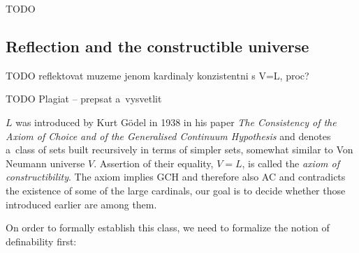 \documentclass[12pt,a4paper]{article}
\newtheorem{definition}[theorem]{Definition}
\newcommand{\bce}{\begin{compactenum}}
\newcommand{\ece}{\end{compactenum}}
\begin{document}
\begin{}
{\begin{comment}
\end{comment}
TODO
}


\subsection{Reflection and the constructible universe}


TODO reflektovat muzeme jenom kardinaly konzistentni s V=L, proc?

TODO Plagiat -- prepsat a~vysvetlit

$L$ was introduced by Kurt Gödel in 1938 in his paper \emph{The Consistency of the Axiom of Choice and of the Generalised Continuum Hypothesis} and denotes a~class of sets built recursively in terms of simpler sets, somewhat similar to Von Neumann universe $V$. Assertion of their equality, $V=L$, is called the \emph{axiom of constructibility}. The axiom implies GCH and therefore also AC and contradicts the existence of some of the large cardinals, our goal is to decide whether those introduced earlier are among them.

On order to formally establish this class, we need to formalize the notion of definability first:
{\color{red}
\begin{comment}

\begin{definition}[Definable sets]
\begin{equation}
Def(X) := \{\{{y | x }\in X \land \langle X, \in \rangle \models \varphi(y, z_1,\ldots,z_n) \} |\mbox{ }\varphi\mbox{ is a~first-order formula, }z_1,\ldots,z_n \in X \}
\end{equation}
\end{definition}

Now we can recursively build $L$.
\begin{definition}[The Constructible universe\newline]
\bce[(i)]
\item
\begin{equation}
L_0 := \emptyset
\end{equation}

\item
\begin{equation}
L_{\alpha+1} := Def(L_{\alpha})
\end{equation}
\item
\begin{equation}
L_{\lambda} = \bigcup_{\alpha < \lambda} L_{\alpha}\mbox{ If }\lambda\mbox{ is a~limit ordinal }
\end{equation}
\item
\begin{equation}
L = \bigcup_{\alpha\in Ord} L_{\alpha}
\end{equation}
\ece
\end{definition}


\end{comment}}
\end{}
\end{document}
